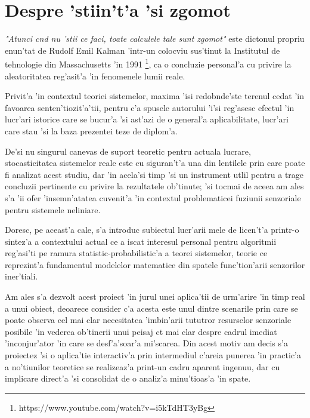 \documentclass[12pt,a4paper,twoside]{report}
\begin{document}
\section{Despre 'stiin't'a 'si zgomot}

\textit{"Atunci c\ia nd nu 'stii ce faci, toate calculele tale sunt zgomot"} este dictonul propriu enun'tat de Rudolf Emil Kalman 'intr-un colocviu sus'tinut la Institutul de tehnologie din Massachusetts 'in 1991 \footnote{https://www.youtube.com/watch?v=i5kTdHT3yBg}, ca o concluzie personal'a cu privire la aleatoritatea reg'asit'a 'in fenomenele lumii reale. 

\vspace{5px}

Privit'a 'in contextul teoriei sistemelor, maxima 'isi redob\ia nde'ste terenul cedat 'in favoarea senten'tiozit'a'tii, pentru c'a spusele autorului 'i'si reg'asesc efectul 'in lucr'ari istorice care se bucur'a 'si ast'azi de o general'a aplicabilitate, lucr'ari care stau 'si la baza prezentei teze de diplom'a. 

\vspace{5px}

De'si nu singurul canevas de suport teoretic pentru actuala lucrare, stocasticitatea sistemelor reale este cu siguran't'a una din lentilele prin care poate fi analizat acest studiu, dar 'in acela'si timp 'si un instrument utlil pentru a trage concluzii pertinente cu privire la rezultatele ob'tinute; 'si tocmai de aceea am ales s'a 'ii ofer 'insemn'atatea cuvenit'a 'in contextul problematicei fuziunii senzoriale pentru sistemele neliniare.

\vspace{5px}

Doresc, pe aceast'a cale, s'a introduc subiectul lucr'arii mele de licen't'a printr-o sintez'a a contextului actual ce a iscat interesul personal pentru algoritmii reg'asi'ti pe ramura statistic-probabilistic'a a teorei sistemelor, teorie ce reprezint'a fundamentul modelelor matematice din spatele func'tion'arii senzorilor iner'tiali.   

\vspace{5px}

Am ales s'a dezvolt acest proiect 'in jurul unei aplica'tii de urm'arire 'in timp real a unui obiect, deoarece consider c'a acesta este unul dintre scenarile prin care se poate observa cel mai clar necesitatea 'imbin'arii tututror resurselor senzoriale posibile 'in vederea ob'tinerii unui peisaj c\ia t mai clar despre cadrul imediat 'inconjur'ator 'in care se desf'a'soar'a mi'scarea. Din acest motiv am decis s'a proiectez 'si o aplica'tie interactiv'a prin intermediul c'areia punerea 'in practic'a a no'tiunilor teoretice se realizeaz'a print-un cadru aparent ingenuu, dar cu implicare direct'a 'si consolidat de o analiz'a minu'tioas'a 'in spate.
\end{document}
